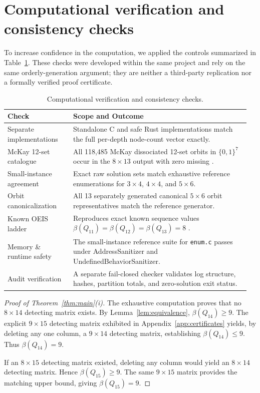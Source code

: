 \documentclass[11pt]{article}
\theoremstyle{plain}
\theoremstyle{definition}
\begin{document}
\section{Computational verification and consistency checks}\label{sec:verification}

To increase confidence in the computation, we applied the controls summarized in Table~\ref{tab:verification}. These checks were developed within the same project and rely on the same orderly-generation argument; they are neither a third-party replication nor a formally verified proof certificate.

\begin{table}[t]
\centering
\setlength{\tabcolsep}{4pt}
\caption{Computational verification and consistency checks.}
\label{tab:verification}
\begin{tabular}{>{\raggedright\arraybackslash}p{0.26\linewidth}>{\raggedright\arraybackslash}p{0.70\linewidth}}
\toprule
Check & Scope and Outcome\\
\midrule
Separate implementations & Standalone C and safe Rust implementations match the full per-depth node-count vector exactly.\\
McKay 12-set catalogue & All 118,485 McKay dissociated 12-set orbits in $\{0,1\}^7$ occur in the $8\times13$ output with zero missing \cite{mckaydata}.\\
Small-instance agreement & Exact raw solution sets match exhaustive reference enumerations for $3\times4$, $4\times4$, and $5\times6$.\\
Orbit canonicalization & All 13 separately generated canonical $5\times6$ orbit representatives match the reference generator.\\
Known OEIS ladder & Reproduces exact known sequence values $\beta(Q_{11})=\beta(Q_{12})=\beta(Q_{13})=8$ \cite{oeisA303735}.\\
Memory \& runtime safety & The small-instance reference suite for \texttt{enum.c} passes under AddressSanitizer and UndefinedBehaviorSanitizer.\\
Audit verification & A separate fail-closed checker validates log structure, hashes, partition totals, and zero-solution exit status.\\
\bottomrule
\end{tabular}
\end{table}

\begin{proof}[Proof of Theorem~\ref{thm:main}(i)]
The exhaustive computation proves that no $8\times 14$ detecting matrix exists. By Lemma~\ref{lem:equivalence}, $\beta(Q_{14}) \ge 9$. The explicit $9\times 15$ detecting matrix exhibited in Appendix~\ref{app:certificates} yields, by deleting any one column, a $9\times 14$ detecting matrix, establishing $\beta(Q_{14}) \le 9$. Thus $\beta(Q_{14}) = 9$.

If an $8\times 15$ detecting matrix existed, deleting any column would yield an $8\times 14$ detecting matrix. Hence $\beta(Q_{15}) \ge 9$. The same $9\times 15$ matrix provides the matching upper bound, giving $\beta(Q_{15}) = 9$.
\end{proof}
\end{document}
